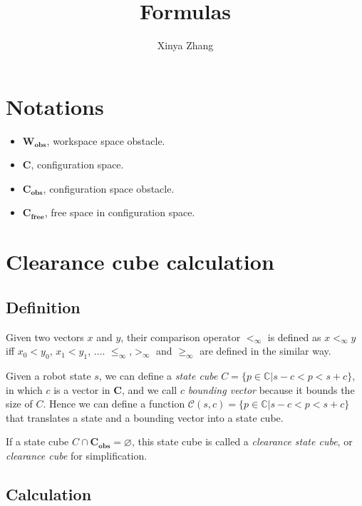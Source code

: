 \documentclass[fleqn,reqno]{amsart}
\theoremstyle{definition}
\let \oldsection \section
\renewcommand{\section}{\vspace{8pt plus 6pt}\oldsection}
\begin{document}

\title{Formulas}


\author{Xinya Zhang}
\maketitle

\section{Notations}
\begin{itemize}
\item $\mathbf{W_{obs}}$, workspace space obstacle.
\item $\mathbf{C}$, configuration space.
\item $\mathbf{C_{obs}}$, configuration space obstacle.
\item $\mathbf{C_{free}}$, free space in configuration space.
\end{itemize}

\section{Clearance cube calculation}

\subsection{Definition}

Given two vectors $x$ and $y$, their comparison operator $<_\infty$ is defined as
$x<_\infty y$ iff $x_0 < y_0$, $x_1<y_1$, $\ldots$. $\le_\infty$,$>_\infty$
and $\ge_\infty$ are defined in the similar way.

Given a robot state $s$, we can define a \emph{state cube}
$C=\{p\in\mathbb{C}|s-c<p<s+c\}$, in
which $c$ is a vector in $\mathbf{C}$, and we call $c$ \emph{bounding vector} because it bounds
the size of $C$. Hence we can define a function $\mathcal{C}(s,
c)=\{p\in\mathbb{C}|s-c<p<s+c\}$ that
translates a state and a bounding vector into a state cube.

If a state cube $C\cap\mathbf{C_{obs}}=\varnothing$, this state cube is called
a \emph{clearance state cube}, or \emph{clearance cube} for simplification.

\subsection{Calculation}
\end{document}

